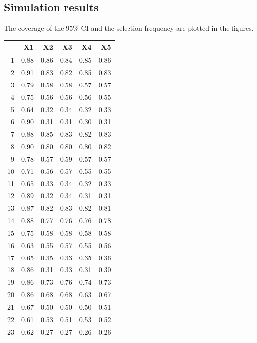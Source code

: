 \documentclass[authoryear, review, 11pt]{elsarticle}
\begin{document}
	\subsection{Simulation results}
		The coverage of the $95\%$ CI and the selection frequency are plotted in the figures.\\
		
\begin{table}[ht]
\begin{center}
\begin{tabular}{rrrrrr}
  \hline
 & X1 & X2 & X3 & X4 & X5 \\ 
  \hline
1 & 0.88 & 0.86 & 0.84 & 0.85 & 0.86 \\ 
  2 & 0.91 & 0.83 & 0.82 & 0.85 & 0.83 \\ 
  3 & 0.79 & 0.58 & 0.58 & 0.57 & 0.57 \\ 
  4 & 0.75 & 0.56 & 0.56 & 0.56 & 0.55 \\ 
  5 & 0.64 & 0.32 & 0.34 & 0.32 & 0.33 \\ 
  6 & 0.90 & 0.31 & 0.31 & 0.30 & 0.31 \\ 
  7 & 0.88 & 0.85 & 0.83 & 0.82 & 0.83 \\ 
  8 & 0.90 & 0.80 & 0.80 & 0.80 & 0.82 \\ 
  9 & 0.78 & 0.57 & 0.59 & 0.57 & 0.57 \\ 
  10 & 0.71 & 0.56 & 0.57 & 0.55 & 0.55 \\ 
  11 & 0.65 & 0.33 & 0.34 & 0.32 & 0.33 \\ 
  12 & 0.89 & 0.32 & 0.34 & 0.31 & 0.31 \\ 
  13 & 0.87 & 0.82 & 0.83 & 0.82 & 0.81 \\ 
  14 & 0.88 & 0.77 & 0.76 & 0.76 & 0.78 \\ 
  15 & 0.75 & 0.58 & 0.58 & 0.58 & 0.58 \\ 
  16 & 0.63 & 0.55 & 0.57 & 0.55 & 0.56 \\ 
  17 & 0.65 & 0.35 & 0.33 & 0.35 & 0.36 \\ 
  18 & 0.86 & 0.31 & 0.33 & 0.31 & 0.30 \\ 
  19 & 0.86 & 0.73 & 0.76 & 0.74 & 0.73 \\ 
  20 & 0.86 & 0.68 & 0.68 & 0.63 & 0.67 \\ 
  21 & 0.67 & 0.50 & 0.50 & 0.50 & 0.51 \\ 
  22 & 0.61 & 0.53 & 0.51 & 0.53 & 0.52 \\ 
  23 & 0.62 & 0.27 & 0.27 & 0.26 & 0.26 \\ 

\end{tabular}
\end{center}
\end{table}
\end{document}

